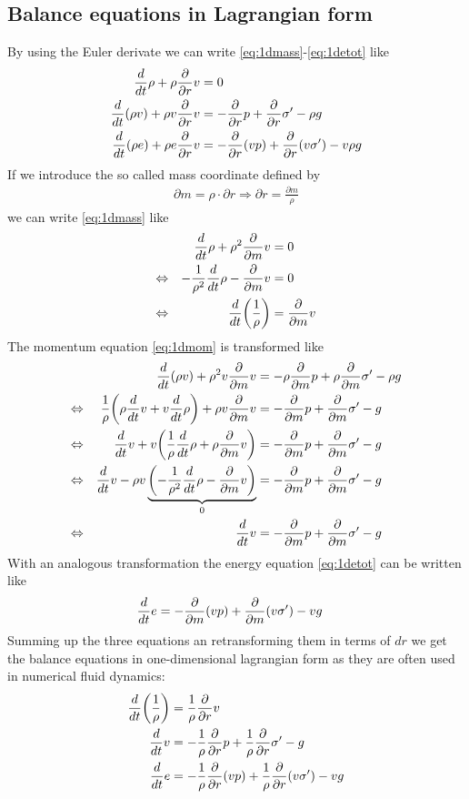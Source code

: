 \subsection{Balance equations in Lagrangian form}
By using the Euler derivate we can write \eqref{eq:1dmass}-\eqref{eq:1detot}
like
\begin{align}
\frac{d}{d t}\rho + \rho \frac{\partial}{\partial r} v &= 0 \\
\frac{d}{d t}(\rho v) + \rho v \frac{\partial}{\partial r} v &= -\frac{\partial}{\partial r}p + \frac{\partial}{\partial r}\sigma' -\rho g  \\
\frac{d}{d t}(\rho e) + \rho e \frac{\partial}{\partial r} v &= -\frac{\partial}{\partial r}(v p) + \frac{\partial}{\partial r}(v \sigma') - v \rho g
\end{align}
If we introduce the so called mass coordinate defined by
\begin{align}
\partial m = \rho\cdot\partial r \Rightarrow \partial r = \frac{\partial
m}{\rho}
\end{align}
we can write \eqref{eq:1dmass} like
\begin{align}
&&\frac{d}{d t}\rho + \rho^2 \frac{\partial}{\partial m} v &= 0 \\
\Leftrightarrow&& -\frac{1}{\rho^2}\frac{d}{d t}\rho - \frac{\partial}{\partial m} v &= 0 \\
\Leftrightarrow&& \frac{d}{d t}{ \left( \frac{1}{\rho} \right) } &= \frac{\partial}{\partial m} v
\end{align}
The momentum equation \eqref{eq:1dmom} is transformed like
\begin{align}
&& \frac{d}{d t}(\rho v) + \rho^2 v \frac{\partial}{\partial m} v &= -\rho \frac{\partial}{\partial m}p + \rho \frac{\partial}{\partial m}\sigma'
-\rho g\\
\Leftrightarrow&& \frac{1}{\rho}{ \left( \rho \frac{d}{d t}v + v\frac{d}{d t}\rho \right) } 
+ \rho v \frac{\partial}{\partial m}v &= -\frac{\partial}{\partial m}p + \frac{\partial}{\partial m}\sigma' - g \\
\Leftrightarrow&& \frac{d}{d t}v + v { \left( \frac{1}{\rho}\frac{d}{d t}\rho+\rho \frac{\partial}{\partial m} v \right) } &=
-\frac{\partial}{\partial m}p + \frac{\partial}{\partial m}\sigma' - g \\
\Leftrightarrow&& \frac{d}{d t}v - \rho v
\underbrace{{ \left( -\frac{1}{\rho^2}\frac{d}{d t}\rho-\frac{\partial}{\partial m} v \right) }}_{0} &=
-\frac{\partial}{\partial m}p + \frac{\partial}{\partial m}\sigma' - g\\
\Leftrightarrow&& \frac{d}{d t}v &= -\frac{\partial}{\partial m}p + \frac{\partial}{\partial m}\sigma' - g
\end{align}
With an analogous transformation the energy equation \eqref{eq:1detot} can be
written like
\begin{align}
\frac{d}{d t}e &= -\frac{\partial}{\partial m}(vp) + \frac{\partial}{\partial m}(v\sigma') - vg
\end{align}
Summing up the three equations an retransforming them in terms of $dr$ we get
the balance equations in one-dimensional lagrangian form as they are often used 
in numerical fluid dynamics:
\begin{align}
\frac{d}{d t}{ \left( \frac{1}{\rho} \right) } &= \frac{1}{\rho}\frac{\partial}{\partial r} v \\
\frac{d}{d t}v &= -\frac{1}{\rho}\frac{\partial}{\partial r}p + \frac{1}{\rho}\frac{\partial}{\partial r}\sigma' - g\\
\frac{d}{d t}e &= -\frac{1}{\rho}\frac{\partial}{\partial r}(vp) + \frac{1}{\rho}\frac{\partial}{\partial r}(v\sigma') - vg
\end{align}





